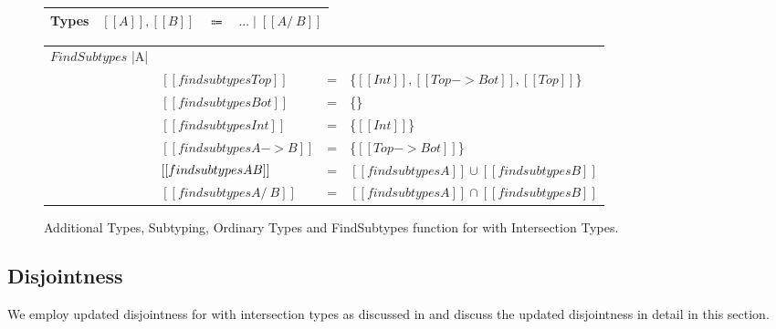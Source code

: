 \begin{figure}[t]
  \begin{small}
    \centering
    \begin{tabular}{lrcl} \toprule
      Types & $[[A]], [[B]]$ & $\Coloneqq$ & $ ... \mid [[A /\ B]] $ \\
      \bottomrule
    \end{tabular}
  \end{small}
  \medskip
    \begin{small}
    \centering
  \end{small}
  \medskip
    \begin{small}
    \centering
  \end{small}
  \medskip
    \centering
    \begin{tabular}{llcl}
      \toprule
      $FindSubtypes$ |A| &  & & \\
     & $[[findsubtypes Top]]$ & = & \{$ [[Int]], [[Top -> Bot]], [[Top]] $\}  \\
     & $[[findsubtypes Bot]]$ & = & \{\}  \\
     & $[[findsubtypes Int]]$ & = & \{$ [[Int]] $\}  \\
     & $[[findsubtypes A -> B]]$ & = & \{$ [[Top -> Bot]] $\}  \\
     & $[[findsubtypes A \/ B]]$ & = & $ [[findsubtypes A]] \cup [[findsubtypes B]] $\\
     & $[[findsubtypes A /\ B]]$ & = & $ [[findsubtypes A]] \cap [[findsubtypes B]] $\\
      \bottomrule
    \end{tabular}
  \caption{Additional Types, Subtyping, Ordinary Types and FindSubtypes function for \cal with Intersection Types.}
  \label{fig:inter:system}
\end{figure}

\subsection{Disjointness}
\label{sec:inter:disj}
We employ updated disjointness for \cal with intersection types as discussed in 
and discuss the updated disjointness in detail in this section.

